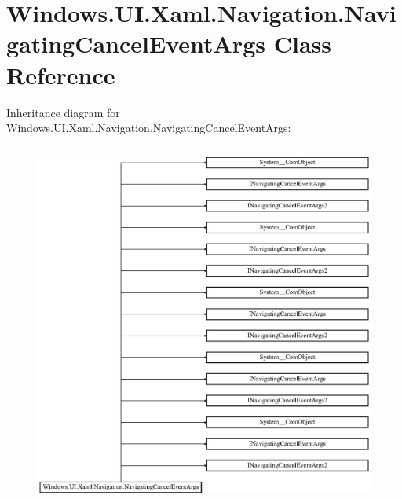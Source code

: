 \hypertarget{class_windows_1_1_u_i_1_1_xaml_1_1_navigation_1_1_navigating_cancel_event_args}{}\section{Windows.\+U\+I.\+Xaml.\+Navigation.\+Navigating\+Cancel\+Event\+Args Class Reference}
\label{class_windows_1_1_u_i_1_1_xaml_1_1_navigation_1_1_navigating_cancel_event_args}
Inheritance diagram for Windows.\+U\+I.\+Xaml.\+Navigation.\+Navigating\+Cancel\+Event\+Args\+:\begin{figure}[H]
\begin{center}
\leavevmode
\includegraphics[height=12.000000cm]{class_windows_1_1_u_i_1_1_xaml_1_1_navigation_1_1_navigating_cancel_event_args}
\end{center}
\end{figure}
